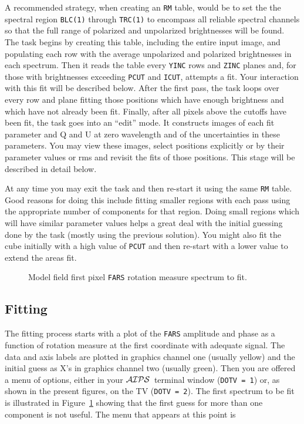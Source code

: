 \documentclass[twoside]{article}
\newcommand{\Me}[1]{\textcolor{mecol}{#1}}
\newcommand{\AIPS}{{$\cal AIPS\/$}}
\newcommand{\putfig}[1]{\texttt{[image: \#1.eps]}}
\begin{document}
A recommended strategy, when creating an {\tt RM} table, would be to
set the \Me{the spectral region {\tt BLC(1)} through {\tt TRC(1)} to
encompass all reliable spectral channels so that the full range of
polarized and unpolarized brightnesses will be found.}  The task
begins by creating this table\Me{, including the entire input
image,} and populating each row with the average unpolarized and
polarized brightnesses in each spectrum.  Then it reads the table
every {\tt YINC} rows and {\tt ZINC} planes and, for those with
brightnesses exceeding {\tt PCUT} and {\tt ICUT}, attempts a fit.
Your interaction with this fit will be described below.  After the
first pass, the task loops over every row and plane fitting those
positions which have enough brightness and which have not already been
fit.  Finally, after all pixels above the cutoffs have been fit, the
task goes into an ``edit'' mode.  It constructs images of each fit
parameter and Q and U at zero wavelength and of the uncertainties in
these parameters.  You may view these images, select positions
explicitly or by their parameter values or rms and revisit the fits of
those positions.  This stage will be described in detail below.

At any time you may exit the task and then re-start it using the
same {\tt RM} table.  Good reasons for doing this include fitting
smaller regions with each pass using the appropriate number of
components for that region.  Doing small regions which will have
similar parameter values helps a great deal with the initial guessing
done by the task (mostly using the previous solution).  You might also
fit the cube initially with a high value of {\tt PCUT} and then
re-start with a lower value to extend the areas fit.

\begin{figure}
\begin{center}
\resizebox{6.0in}{!}{\putfig{RMFIT.init3}}
\caption{Model field first pixel {\tt FARS} rotation measure spectrum
  to fit.}
\label{fig:RMFIT.init}
\end{center}
\end{figure}

\subsection{Fitting}

The fitting process starts with a plot of the {\tt FARS} amplitude and
phase as a function of rotation measure at the first coordinate with
adequate signal.  The data and axis labels are plotted in graphics
channel one (usually yellow) and the initial guess as X's in graphics
channel two (usually green).  Then you are offered a menu of options,
either in your \AIPS\ terminal window ({\tt DOTV = 1}) or, as shown in
the present figures, on the TV ({\tt DOTV = 2}).  The first spectrum
to be fit is illustrated in Figure~\ref{fig:RMFIT.init} showing
that the first guess for more than one component is not useful.  The
menu that appears at this point is\\
\end{document}
